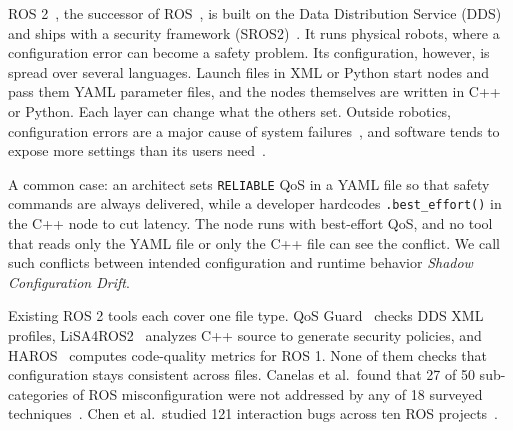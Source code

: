 \documentclass[conference]{IEEEtran}
\newcommand{\code}[1]{\texttt{#1}}
\begin{document}
ROS 2~\cite{macenski2022ros2}, the successor of ROS~\cite{quigley2009ros}, is built on the Data
Distribution Service (DDS)~\cite{omg2015dds} and ships with a security framework
(SROS2)~\cite{mayoral2022sros2}. It runs physical robots, where a configuration error can become
a safety problem. Its configuration, however, is spread over several languages. Launch files in
XML or Python start nodes and pass them YAML parameter files, and the nodes themselves are
written in C++ or Python. Each layer can change what the others set. Outside robotics,
configuration errors are a major cause of system failures~\cite{yin2011config,xu2015survey},
and software tends to expose more settings than its users need~\cite{xu2015knobs}.

A common case: an architect sets \code{RELIABLE} QoS in a YAML file so that safety commands are
always delivered, while a developer hardcodes \code{.best\_effort()} in the C++ node to cut
latency. The node runs with best-effort QoS, and no tool that reads only the YAML file or only
the C++ file can see the conflict. We call such conflicts between intended configuration and
runtime behavior \emph{Shadow Configuration Drift}.

Existing ROS 2 tools each cover one file type. QoS Guard~\cite{lee2025qosguard} checks DDS XML
profiles, LiSA4ROS2~\cite{zanatta2024lisa4ros2} analyzes C++ source to generate security
policies, and HAROS~\cite{santos2021haros} computes code-quality metrics for ROS 1. None of
them checks that configuration stays consistent across files. Canelas et al.\ found that 27 of
50 sub-categories of ROS misconfiguration were not addressed by any of 18 surveyed
techniques~\cite{canelas2024misconfig}. Chen et al.\ studied 121 interaction bugs across ten ROS
projects~\cite{chen2025ibugs}.
\end{document}
